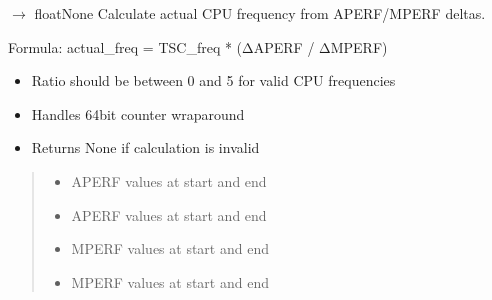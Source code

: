 \documentclass[letterpaper,10pt,english]{sphinxmanual}
\begin{document}
\begin{fulllineitems}
\begin{fulllineitems}
\label{\detokenize{core.readers.msr_reader:core.readers.msr_reader.MSRReader.calculate_actual_frequency}}
\pysigstartsignatures
\pysiglinewithargsret
{}
{\sphinxparamcomma {}\sphinxparamcomma {}\sphinxparamcomma {}}
{{ $\rightarrow$ floatNone}}
\pysigstopsignatures
\sphinxAtStartPar
Calculate actual CPU frequency from APERF/MPERF deltas.

\sphinxAtStartPar
Formula: actual\_freq = TSC\_freq * (ΔAPERF / ΔMPERF)
\begin{description}
\begin{itemize}
\item {} 
\sphinxAtStartPar
Ratio should be between 0 and 5 for valid CPU frequencies

\item {} 
\sphinxAtStartPar
Handles 64\sphinxhyphen{}bit counter wrap\sphinxhyphen{}around

\item {} 
\sphinxAtStartPar
Returns None if calculation is invalid

\end{itemize}

\end{description}
\begin{quote}\begin{description}
\begin{itemize}
\item {} 
\sphinxAtStartPar
{} \textendash{} APERF values at start and end

\item {} 
\sphinxAtStartPar
{} \textendash{} APERF values at start and end

\item {} 
\sphinxAtStartPar
{} \textendash{} MPERF values at start and end

\item {} 
\sphinxAtStartPar
{} \textendash{} MPERF values at start and end


\end{itemize}
\end{description}
\end{quote}
\end{fulllineitems}
\end{fulllineitems}
\end{document}
